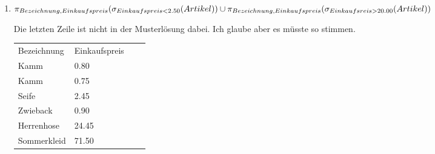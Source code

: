 \documentclass{bschlangaul-aufgabe}
\begin{document}
\begin{enumerate}
\begin{enumerate}

\item

\begin{math}
\pi_{Bezeichnung,Einkaufspreis}(\sigma_{Einkaufspreis < 2.50} (Artikel))
\cup\\
\pi_{Bezeichnung,Einkaufspreis}(\sigma_{Einkaufsreis > 20.00} (Artikel))
\end{math}

\begin{bAntwort}
Die letzten Zeile ist nicht in der Musterlösung dabei. Ich glaube aber
es müsste so stimmen.

\begin{tabular}{llll}
Bezeichnung  & Einkaufspreis \\
Kamm         & 0.80          \\
Kamm         & 0.75          \\
Seife        & 2.45          \\
Zwieback     & 0.90          \\
Herrenhose   & 24.45         \\
Sommerkleid  & 71.50
\end{tabular}
\end{bAntwort}
\end{enumerate}
\end{enumerate}

%

\end{document}
